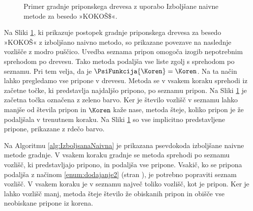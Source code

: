 \begin{figure}[tb]
       \caption{Primer gradnje priponskega drevesa z uporabo Izboljšane naivne metode za besedo »KOKOŠ$\$$«.} 
        \label{fig:IzbolšanaNaivna}
\end{figure}

Na Sliki \ref{fig:IzbolšanaNaivna}, ki prikazuje postopek gradnje priponskega drevesa za besedo »KOKOŠ« z izboljšano naivno metodo, so prikazane povezave na naslednje vozlišče z modro puščico. Uvedba seznama pripon omogoča izogib nepotrebnim sprehodom po drevesu. Tako metoda podaljša vse liste zgolj s sprehodom po seznamu. Pri tem velja, da je $\PsiFunkcija{\Koren}=\Koren$. Na ta način lahko pregledamo vse pripone v drevesu. Metoda se v vsakem koraku sprehodi iz začetne točke, ki predstavlja najdaljšo pripono, po seznamu pripon. Na Sliki \ref{fig:IzbolšanaNaivna} je začetna točka označena z zeleno barvo. Ker je število vozlišč v seznamu lahko manjše od števila pripon in $\Koren$ kaže nase, metoda šteje, koliko pripon je že podaljšala v trenutnem koraku. Na Sliki \ref{fig:IzbolšanaNaivna} so vse implicitno predstavljene pripone, prikazane z rdečo barvo.

Na Algoritmu \ref{alg:IzboljsanaNaivna} je prikazana psevdokoda izboljšane naivne metode gradnje. V vsakem koraku gradnje se metoda sprehodi po seznamu vozlišč, ki predstavljajo pripono, in podaljša vse pripone. Vsakič, ko se pripona podaljša z načinom \ref{enum:dodajanje2} (stran \pageref{par:naciniDodajanja}), je potrebno popraviti seznam vozlišč. V vsakem koraku je v seznamu največ toliko vozlišč, kot je pripon. Ker je lahko vozlišč manj, metoda šteje število že obiskanih pripon in obišče vse neobiskane pripone iz korena.

